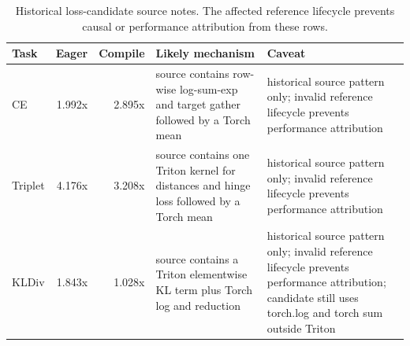 \begin{table}[htbp]
\centering
\caption{Historical loss-candidate source notes. The affected reference lifecycle prevents causal or performance attribution from these rows.}
\label{tab:kernelbench-loss-interpretation}
\scriptsize
\begin{tabularx}{\linewidth}{l r r X X}
\toprule
Task & Eager & Compile & Likely mechanism & Caveat \\
\midrule
CE & 1.992x & 2.895x & source contains row-wise log-sum-exp and target gather followed by a Torch mean & historical source pattern only; invalid reference lifecycle prevents performance attribution \\
Triplet & 4.176x & 3.208x & source contains one Triton kernel for distances and hinge loss followed by a Torch mean & historical source pattern only; invalid reference lifecycle prevents performance attribution \\
KLDiv & 1.843x & 1.028x & source contains a Triton elementwise KL term plus Torch log and reduction & historical source pattern only; invalid reference lifecycle prevents performance attribution; candidate still uses torch.log and torch sum outside Triton \\
\bottomrule
\end{tabularx}
\end{table}
